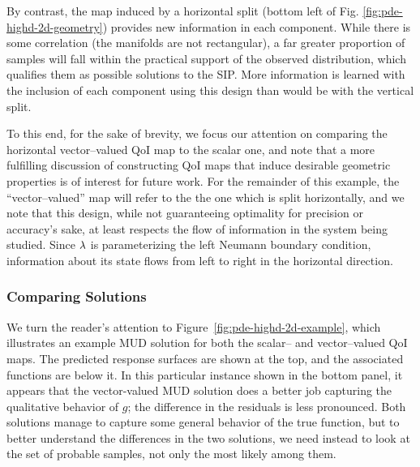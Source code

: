 By contrast, the map induced by a horizontal split (bottom left of Fig. \ref{fig:pde-highd-2d-geometry}) provides new information in each component.
While there is some correlation (the manifolds are not rectangular), a far greater proportion of samples will fall within the practical support of the observed distribution, which qualifies them as possible solutions to the SIP.
More information is learned with the inclusion of each component using this design than would be with the vertical split.

To this end, for the sake of brevity, we focus our attention on comparing the horizontal vector--valued QoI map to the scalar one, and note that a more fulfilling discussion of constructing QoI maps that induce desirable geometric properties is of interest for future work.
For the remainder of this example, the ``vector--valued'' map will refer to the the one which is split horizontally, and we note that this design, while not guaranteeing optimality for precision or accuracy's sake, at least respects the flow of information in the system being studied.
Since $\lambda$ is parameterizing the left Neumann boundary condition, information about its state flows from left to right in the horizontal direction.



\FloatBarrier
\subsubsection{Comparing Solutions}

We turn the reader's attention to Figure~\ref{fig:pde-highd-2d-example}, which illustrates an example MUD solution for both the scalar-- and vector--valued QoI maps.
The predicted response surfaces are shown at the top, and the associated functions are below it.
In this particular instance shown in the bottom panel, it appears that the vector-valued MUD solution does a better job capturing the qualitative behavior of $g$; the difference in the residuals is less pronounced.
Both solutions manage to capture some general behavior of the true function, but to better understand the differences in the two solutions, we need instead to look at the set of probable samples, not only the most likely among them.

